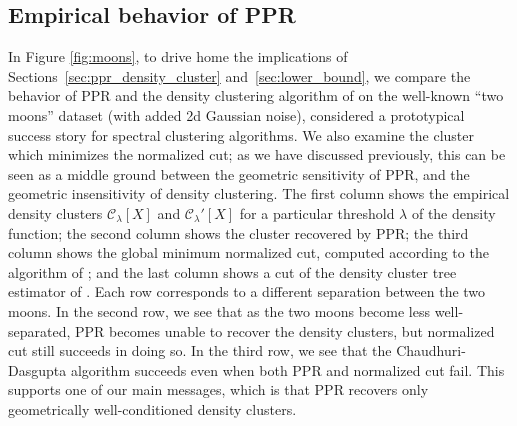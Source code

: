 \documentclass[11pt,twoside]{article}
\newcommand{\1}{\mathbf{1}}
\newcommand{\mc}[1]{\mathcal{#1}}
\begin{document}
\subsection{Empirical behavior of PPR} 
\label{subsec:empirical_behavior_ppr}
In Figure \ref{fig:moons}, to drive home 
the implications of Sections~\ref{sec:ppr_density_cluster} and~\ref{sec:lower_bound}, we compare the behavior of PPR
and the density clustering algorithm of \citet{chaudhuri2010} on
the well-known ``two moons'' dataset (with added 2d Gaussian noise), considered
a prototypical success story for spectral clustering algorithms. We also examine the cluster which minimizes the normalized cut; as we have discussed previously, this can be seen as a middle ground between the geometric sensitivity of PPR, and the geometric insensitivity of density clustering. The first
column shows the empirical density clusters $\mc{C}_{\lambda}[X]$ and $\mc{C}_{\lambda}'[X]$ for
a particular threshold $\lambda$ of the density function; the second column
shows the cluster recovered by PPR; the third column shows the global minimum
normalized cut, computed according to the algorithm of \citet{bresson2013}; and
the last column shows a cut of the density cluster tree estimator of
\citet{chaudhuri2010}. Each row corresponds to a different separation between the two moons. In the second row, we see that as the two moons become less well-separated, PPR becomes unable to recover the density clusters, but
normalized cut still succeeds in doing so. In the third row, we see that the
Chaudhuri-Dasgupta algorithm succeeds even when both PPR and normalized cut
fail. This supports one of our main messages, which is that PPR recovers only
geometrically well-conditioned density clusters.
\end{document}
